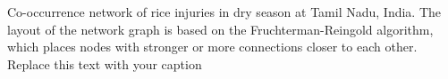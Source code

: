 Co-occurrence network of rice injuries in dry season at Tamil Nadu, India. The layout of the network graph is based on the Fruchterman-Reingold algorithm, which places nodes with stronger or more connections closer to each other.
        \label{fig:networkTM_ds}Replace this text with your caption